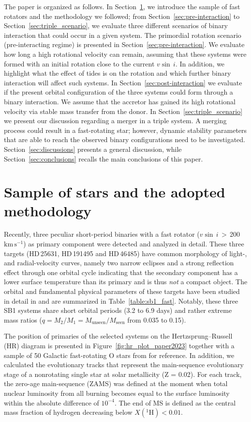 \documentclass{aa}
\newcommand{\kms}{$\mathrm{km\,s^{-1}}$}
\newcommand{\vsini} {$v\sin\,i$}
\DeclareRobustCommand{\Figref}[1]{Figure~\ref{#1}}
\DeclareRobustCommand{\Tabref}[1]{Table~\ref{#1}}
\DeclareRobustCommand{\Secref}[1]{Section~\ref{#1}}
\begin{document}
The paper is organized as follows. In \Secref{sec:sample}, we introduce the sample of fast rotators and the methodology we followed; from \Secref{sec:pre-interaction} to \Secref{sec:triple_scenario}, we evaluate three different scenarios of binary interaction that could occur in a given system.
The primordial rotation scenario (pre-interacting regime) is presented
in \Secref{sec:pre-interaction}. We evaluate how long a high
rotational velocity can remain, assuming that these systems were formed
with an initial rotation close to the current \vsini. In addition, we highlight what the effect of tides is on the rotation and which further binary interaction will affect such systems.
In \Secref{sec:post-interaction} we evaluate if the present orbital configuration of the three systems could form through a binary interaction. We assume that the accretor has gained its high rotational velocity via stable mass transfer from the donor.
In \Secref{sec:triple_scenario} we present our discussion regarding a merger in a triple system. A merging process could result in a fast-rotating star; however, dynamic stability parameters that are able to reach the observed binary configurations need to be investigated.
\Secref{sec:discussions} presents a general discussion, while \Secref{sec:conclusions} recalls the main conclusions of this paper.




\section{Sample of stars and the adopted methodology}
\label{sec:sample}

Recently, three peculiar short-period binaries with a fast rotator
(\vsini\,$>$\,200~\kms) as primary component \citep{Naze_2023_rot}
were detected and analyzed in detail. These three targets (HD\,25631,
HD\,191495 and HD\,46485) have common morphology of light-, and
radial-velocity curves, namely two narrow eclipses and a strong
reflection effect through one orbital cycle indicating that the
secondary component has a lower surface temperature than its primary
and is thus \emph{not} a compact object. The orbital and
fundamental physical parameters of these targets have been studied in
detail in \citet{Naze_2023_rot} and are summarized in \Tabref{table:sb1_fast}. Notably, these three SB1 systems
share short orbital periods (3.2 to 6.9 days) and rather extreme
mass ratios ($q=M_2/M_1=M_\mathrm{unseen}/M_\mathrm{seen}$ from 0.035 to 0.15).

The position of primaries of the selected systems on the Hertzsprung--Russell (HR)
diagram is presented in \Figref{fig:hr_plot_paper2023} together
with a sample of 50 Galactic fast-rotating O stars from \citet{Britavskiy_2023} for reference.
In addition, we calculated the evolutionary tracks that represent the main-sequence evolutionary stage of a nonrotating single star at solar metallicity (Z = 0.02).
For each track, the zero-age main-sequence (ZAMS) was defined at the moment when total nuclear luminosity from all burning becomes equal to the surface luminosity within the absolute difference of $10^{-4}$.
The end of MS is defined as the central mass fraction of hydrogen decreasing below $X(^{1}\mathrm{H})<0.01$.
\end{document}
